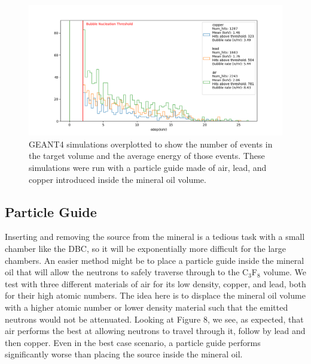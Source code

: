 \documentclass[%
12pt,
twoside,
reprint,
amsmath,amssymb,
aps,
]{article}
\begin{document}
	\begin{figure}[!b]
		\includegraphics[scale = 0.6, center]{Images/particle_guide_normalized.png}
		\caption{\label{tab:table-name} GEANT4 simulations overplotted to show the number of events in the target volume and the average energy of those events. These simulations were run with a particle guide made of air, lead, and copper introduced inside the mineral oil volume.}
	\end{figure}
	
	\subsection{Particle Guide}
	\par Inserting and removing the source from the mineral is a tedious task with a small chamber like the DBC, so it will be exponentially more difficult for the large chambers. An easier method might be to place a particle guide inside the mineral oil that will allow the neutrons to safely traverse through to the C$_{3}$F$_{8}$ volume. We test with three different materials of air for its low density, copper, and lead, both for their high atomic numbers. The idea here is to displace the mineral oil volume with a higher atomic number or lower density material such that the emitted neutrons would not be attenuated. Looking at Figure 8, we see, as expected, that air performs the best at allowing neutrons to travel through it, follow by lead and then copper. Even in the best case scenario, a particle guide performs significantly worse than placing the source inside the mineral oil.
\end{document}
